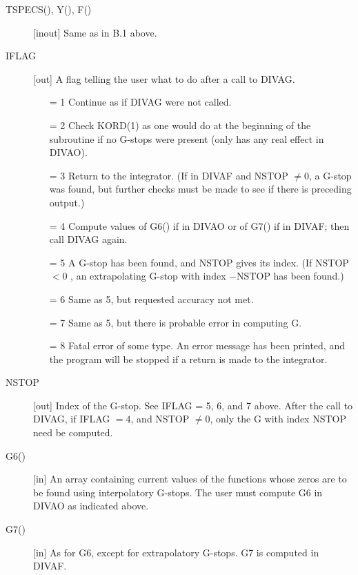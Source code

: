 \documentclass[twoside]{MATH77}
\begin{document}
\begin{description}
\item[TSPECS(), Y(), F()]  [inout] Same as in B.1 above.

\item[IFLAG]  [out] A flag telling the user what to do after a call to DIVAG.
\begin{itemize}
\item[= 1] Continue as if DIVAG were not called.

\item[= 2] Check KORD(1) as one would do at the beginning of the subroutine
if no G-stops were present (only has any real effect in DIVAO).

\item[= 3] Return to the integrator. (If in DIVAF and NSTOP $\neq 0$, a
G-stop was found, but further checks must be made to see if there is
preceding output.)

\item[= 4] Compute values of G6() if in DIVAO or of G7() if in DIVAF;
then call DIVAG again.

\item[= 5] A G-stop has been found, and NSTOP gives its index. (If NSTOP $< 0$%
, an extrapolating G-stop with index $-$NSTOP has been found.)

\item[= 6] Same as 5, but requested accuracy not met.

\item[= 7] Same as 5, but there is probable error in computing G.

\item[= 8] Fatal error of some type. An error message has been printed, and
the program will be stopped if a return is made to the integrator.
\end{itemize}
\item[NSTOP] [out] Index of the G-stop. See IFLAG = 5, 6, and 7 above. After
  the call to DIVAG, if IFLAG $=4$, and NSTOP $\neq 0$, only the G with index
  NSTOP need be computed.

\item[G6()]  [in] An array containing current values of the functions whose
zeros are to be found using interpolatory G-stops. The user must compute G6
in DIVAO as indicated above.

\item[G7()]  [in] As for G6, except for extrapolatory G-stops. G7 is
computed in DIVAF.


\end{description}
\end{document}
